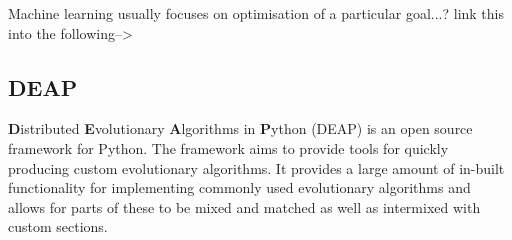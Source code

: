 \documentclass{article}
\begin{document}
Machine learning usually focuses on optimisation of a particular goal...? link this into the following-->

\subsection{DEAP}
\textbf{D}istributed \textbf{E}volutionary \textbf{A}lgorithms in \textbf{P}ython (DEAP) is an open source framework for Python\cite{deap}. The framework aims to provide tools for quickly producing custom evolutionary algorithms. It provides a large amount of in-built functionality for implementing commonly used evolutionary algorithms and allows for parts of these to be mixed and matched as well as intermixed with custom sections. %
\end{document}
